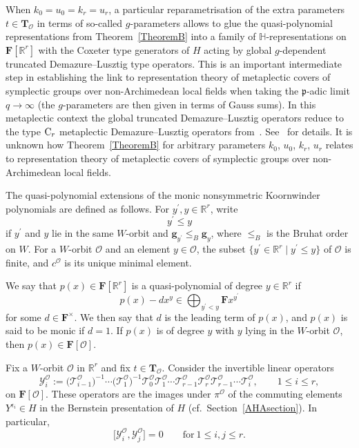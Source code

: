 \documentclass[pdftex]{sigma}
\numberwithin{equation}{section}
\begin{document}
{When $k_0=u_0=k_r=u_r$, a particular reparametrisation of the extra parameters $t\in\mathbf{T}_{\mathcal{O}}$ in terms of so-called $g$-parameters allows to glue the quasi-polynomial representations from Theorem~\ref{TheoremB} into a family of $\mathbb{H}$-representations on $\mathbf{F}[\mathbb{R}^r]$ with the Coxeter type generators of $H$ acting by global $g$-dependent truncated Demazure--Lusztig type operators. This is an important intermediate step in establishing the link to representation theory of metaplectic covers of symplectic groups over non-Archimedean local fields when taking the $\mathfrak{p}$-adic limit $q\rightarrow\infty$ (the $g$-parameters are then given in terms of Gauss sums). In this metaplectic context the global truncated Demazure--Lusztig operators
reduce to the type ${\rm C}_r$ metaplectic Demazure--Lusztig operators from~\cite{BBBF,CGP,PP,PP2}. See~\cite{SSV2} for details. It is unknown how Theorem~\ref{TheoremB} for arbitrary parameters $k_0$, $u_0$, $k_r$, $u_r$ relates to
representation theory of metaplectic covers of symplectic groups over non-Archimedean local fields.

\mypar\label{1.4}
The quasi-polynomial extensions of the monic nonsymmetric Koornwinder polynomials are defined as follows.
For $y^\prime,y\in\mathbb{R}^r$, write
\[
y^\prime\leq y
\]
if $y^\prime$ and $y$ lie in the same $W$-orbit and $\mathbf{g}_{y^\prime}\leq_B\mathbf{g}_{y}$, where $\leq_B$ is the Bruhat order
on $W$. For a $W$-orbit $\mathcal{O}$ and an element $y\in\mathcal{O}$, the subset $\{y^\prime\in\mathbb{R}^r\mid y^\prime\leq y\}$ of $\mathcal{O}$ is finite, and $c^\mathcal{O}$ is its unique minimal element.

We say that $p(x)\in\mathbf{F}[\mathbb{R}^r]$ is a quasi-polynomial of degree $y\in\mathbb{R}^r$ if
\[
p(x)-dx^y\in\bigoplus_{y^\prime<y}\mathbf{F}x^{y^\prime}
\]
for some $d\in\mathbf{F}^\times$. We then say that $d$ is the leading term of $p(x)$, and $p(x)$ is said to be monic if $d=1$.
If $p(x)$ is of degree $y$ with $y$ lying in the $W$-orbit $\mathcal{O}$, then
$p(x)\in\mathbf{F}[\mathcal{O}]$.

Fix a $W$-orbit $\mathcal{O}$ in $\mathbb{R}^r$ and fix $t\in\mathbf{T}_{\mathcal{O}}$. Consider the invertible linear operators
\begin{equation*}%
\mathcal{Y}_i^{\mathcal{O}}:=\bigl(\mathcal{T}_{i-1}^{\mathcal{O}}\bigr)^{-1}\cdots \bigl(\mathcal{T}_1^{\mathcal{O}}\bigr)^{-1}\mathcal{T}_0^{\mathcal{O}}\mathcal{T}_1^{\mathcal{O}}\cdots\mathcal{T}_{r-1}^{\mathcal{O}}\mathcal{T}_r^{\mathcal{O}}\mathcal{T}_{r-1}^{\mathcal{O}}\cdots
\mathcal{T}_i^{\mathcal{O}},\qquad 1\leq i\leq r,
\end{equation*}
on $\mathbf{F}[\mathcal{O}]$. These operators are the images under $\pi^{\mathcal{O}}$ of the commuting elements $Y^{\epsilon_i}\in H$ in the Bernstein presentation of $H$
(cf.\ Section~\ref{AHAsection}). In particular,
\[
\bigl[ \mathcal{Y}_i^{\mathcal{O}},\mathcal{Y}_j^{\mathcal{O}}\bigr]=0\qquad \text{for}\ 1\leq i,j\leq r.
\]

}
\end{document}
